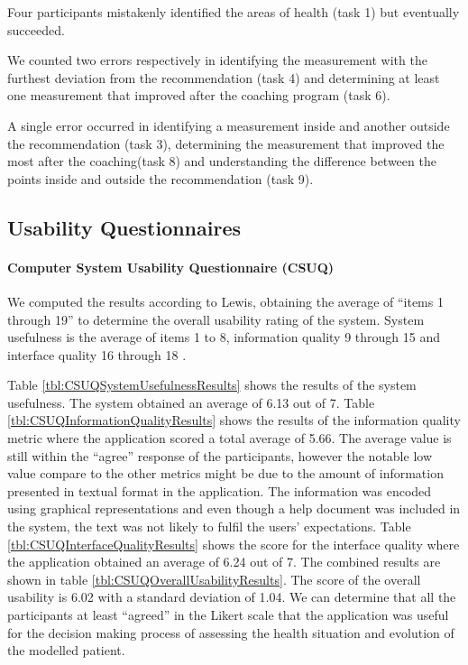 \documentclass[twocolumn]{bmcart}%
\begin{document}
Four participants mistakenly identified the areas of health (task 1) but eventually succeeded.


We counted two errors respectively in identifying the measurement with the furthest deviation from the recommendation (task 4) and determining at least one measurement that improved after the coaching program (task 6).


A single error occurred in identifying a measurement inside and another outside the recommendation (task 3), determining the measurement that improved the most after the coaching(task 8) and understanding the difference between the points inside and outside the recommendation (task 9). 

\subsection*{Usability Questionnaires}

\paragraph*{Computer System Usability Questionnaire (CSUQ)}
We computed the results according to Lewis, obtaining the average of ``items 1 through 19'' to determine the overall usability rating of the system. System usefulness is the average of items 1 to 8, information quality 9 through 15 and interface quality 16 through 18 \cite{lewis2002psychometric}.

Table \ref{tbl:CSUQSystemUsefulnessResults} shows the results of the system usefulness. The system obtained an average of 6.13 out of 7. Table \ref{tbl:CSUQInformationQualityResults} shows the results of the information quality metric where the application scored a total average of 5.66. The average value is still within the ``agree'' response of the participants, however the notable low value compare to the other metrics might be due to the amount of information presented in textual format in the application. The information was encoded using graphical representations and even though a help document was included in the system, the text was not likely to fulfil the users' expectations. Table \ref{tbl:CSUQInterfaceQualityResults} shows the score for the interface quality where the application obtained an average of 6.24 out of 7. The combined results are shown in table \ref{tbl:CSUQOverallUsabilityResults}. The score of the overall usability is 6.02 with a standard deviation of 1.04. We can determine that all the participants at least ``agreed'' in the Likert scale that the application was useful for the decision making process of assessing the health situation and evolution of the modelled patient.
\end{document}
